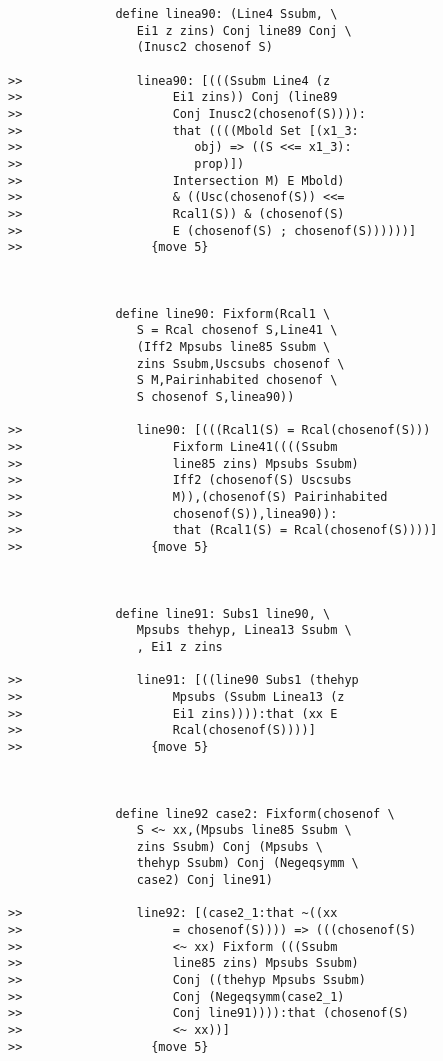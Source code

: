 \documentclass[12pt]{article}
\begin{document}
\begin{verbatim}
               define linea90: (Line4 Ssubm, \
                  Ei1 z zins) Conj line89 Conj \
                  (Inusc2 chosenof S)

>>                linea90: [(((Ssubm Line4 (z
>>                     Ei1 zins)) Conj (line89
>>                     Conj Inusc2(chosenof(S)))):
>>                     that ((((Mbold Set [(x1_3:
>>                        obj) => ((S <<= x1_3):
>>                        prop)])
>>                     Intersection M) E Mbold)
>>                     & ((Usc(chosenof(S)) <<=
>>                     Rcal1(S)) & (chosenof(S)
>>                     E (chosenof(S) ; chosenof(S))))))]
>>                  {move 5}



               define line90: Fixform(Rcal1 \
                  S = Rcal chosenof S,Line41 \
                  (Iff2 Mpsubs line85 Ssubm \
                  zins Ssubm,Uscsubs chosenof \
                  S M,Pairinhabited chosenof \
                  S chosenof S,linea90))

>>                line90: [(((Rcal1(S) = Rcal(chosenof(S)))
>>                     Fixform Line41((((Ssubm
>>                     line85 zins) Mpsubs Ssubm)
>>                     Iff2 (chosenof(S) Uscsubs
>>                     M)),(chosenof(S) Pairinhabited
>>                     chosenof(S)),linea90)):
>>                     that (Rcal1(S) = Rcal(chosenof(S))))]
>>                  {move 5}



               define line91: Subs1 line90, \
                  Mpsubs thehyp, Linea13 Ssubm \
                  , Ei1 z zins

>>                line91: [((line90 Subs1 (thehyp
>>                     Mpsubs (Ssubm Linea13 (z
>>                     Ei1 zins)))):that (xx E
>>                     Rcal(chosenof(S))))]
>>                  {move 5}



               define line92 case2: Fixform(chosenof \
                  S <~ xx,(Mpsubs line85 Ssubm \
                  zins Ssubm) Conj (Mpsubs \
                  thehyp Ssubm) Conj (Negeqsymm \
                  case2) Conj line91)

>>                line92: [(case2_1:that ~((xx
>>                     = chosenof(S)))) => (((chosenof(S)
>>                     <~ xx) Fixform (((Ssubm
>>                     line85 zins) Mpsubs Ssubm)
>>                     Conj ((thehyp Mpsubs Ssubm)
>>                     Conj (Negeqsymm(case2_1)
>>                     Conj line91)))):that (chosenof(S)
>>                     <~ xx))]
>>                  {move 5}




\end{verbatim}
\end{document}
